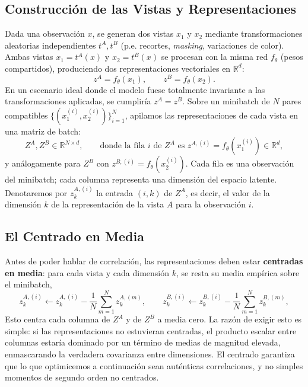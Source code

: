 \subsection{Construcción de las Vistas y Representaciones}

Dada una observación $x$, se generan dos vistas $x_1$ y $x_2$ mediante transformaciones aleatorias independientes $t^A, t^B$ (p.e. recortes, \textit{masking}, variaciones de color). Ambas vistas $x_1 = t^A(x)$ y $x_2 = t^B(x)$ se procesan con la misma red $f_\theta$ (pesos compartidos), produciendo dos representaciones vectoriales en $\mathbb{R}^d$:
\begin{equation}
z^A = f_\theta(x_1), \qquad z^B = f_\theta(x_2).
\end{equation}
En un escenario ideal donde el modelo fuese totalmente invariante a las transformaciones aplicadas, se cumpliría $z^A = z^B$. Sobre un minibatch de $N$ pares compatibles $\{(x_1^{(i)}, x_2^{(i)})\}_{i=1}^N$, apilamos las representaciones de cada vista en una matriz de batch:
\begin{equation}
Z^A, Z^B \in \mathbb{R}^{N \times d}, \qquad \text{donde la fila } i \text{ de } Z^A \text{ es } z^{A,(i)} = f_\theta(x_1^{(i)}) \in \mathbb{R}^d,
\end{equation}
y análogamente para $Z^B$ con $z^{B,(i)} = f_\theta(x_2^{(i)})$. Cada fila es una observación del minibatch; cada columna representa una dimensión del espacio latente. Denotaremos por $z_k^{A,(i)}$ la entrada $(i,k)$ de $Z^A$, es decir, el valor de la dimensión $k$ de la representación de la vista $A$ para la observación $i$.

\subsection{El Centrado en Media}

Antes de poder hablar de correlación, las representaciones deben estar \textbf{centradas en media}: para cada vista y cada dimensión $k$, se resta su media empírica sobre el minibatch,
\begin{equation}
z_k^{A,(i)} \gets z_k^{A,(i)} - \frac{1}{N}\sum_{m=1}^N z_k^{A,(m)}, \qquad z_k^{B,(i)} \gets z_k^{B,(i)} - \frac{1}{N}\sum_{m=1}^N z_k^{B,(m)},
\end{equation}
Esto centra cada columna de $Z^A$ y de $Z^B$ a media cero. La razón de exigir esto es simple: si las representaciones no estuvieran centradas, el producto escalar entre columnas estaría dominado por un término de medias de magnitud elevada, enmascarando la verdadera covarianza entre dimensiones. El centrado garantiza que lo que optimicemos a continuación sean auténticas correlaciones, y no simples momentos de segundo orden no centrados.

